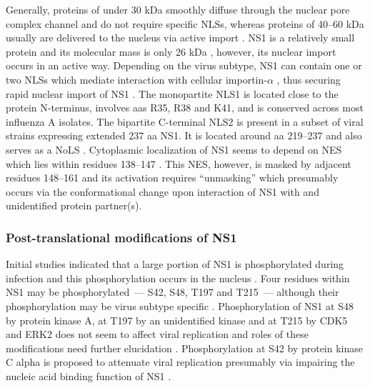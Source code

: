 		Generally, proteins of under 30 kDa smoothly diffuse through the nuclear pore complex channel and do not require specific \glspl{NLS}, whereas proteins of 40--60 kDa usually are delivered to the nucleus via active import \parencite{Macara2001, Wang2007, Ma2012}. \gls{NS1} is a relatively small protein and its molecular mass is only 26 kDa \parencite{Ward1994}, however, its nuclear import occurs in an active way. Depending on the virus subtype, \gls{NS1} can contain one or two \glspl{NLS} which mediate interaction with cellular importin-$\alpha$ \parencite{Melen2007}, thus securing rapid nuclear import of \gls{NS1} \parencite{Privalsky1981}. The monopartite \gls{NLS}1 is located close to the protein N-terminus, involves \glspl{aa} R35, R38 and K41, and is conserved across most influenza A isolates. The bipartite C-terminal NLS2 is present in a subset of viral strains expressing extended 237 \gls{aa} \gls{NS1}. It is located around \gls{aa} 219--237 and also serves as a \gls{NoLS} \parencite{Melen2007, Melen2012}. Cytoplasmic localization of \gls{NS1} seems to depend on \gls{NES} which lies within residues 138--147 \parencite{Li1998}. This \gls{NES}, however, is masked by adjacent residues 148--161 and its activation requires ``unmasking'' which presumably occurs via the conformational change upon interaction of \gls{NS1} with and unidentified protein partner(s). 
		
		\subsubsection{Post-translational modifications of NS1}
		
		
		Initial studies indicated that a large portion of \gls{NS1} is phosphorylated during infection and this phosphorylation occurs in the nucleus \parencite{Privalsky1981}. Four residues within \gls{NS1} may be phosphorylated~--- S42, S48, T197 and T215~--- although their phosphorylation may be virus subtype specific \parencite{Petri1982}. Phosphorylation of \gls{NS1} at S48 by protein kinase A, at T197 by an unidentified kinase and at T215 by \gls{CDK5} and \gls{ERK2} does not seem to affect viral replication and roles of these modifications need further elucidation \parencite{Hale2009, Hutchinson2012, Hsiang2012}. Phosphorylation at S42 by protein kinase C alpha is proposed to attenuate viral replication presumably via impairing the nucleic acid binding function of \gls{NS1} \parencite{Hsiang2012}.
		
